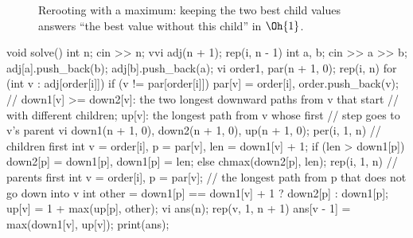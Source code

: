 \begin{figure}[htbp]
\centering
{}
\caption{Rerooting with a maximum: keeping the two best child values answers ``the best value without this child'' in $\Oh{1}$.}
\label{fig:reroot2}
\end{figure}

\begin{code}
void solve() {
    int n;
    cin >> n;
    vvi adj(n + 1);
    rep(i, n - 1) {
        int a, b;
        cin >> a >> b;
        adj[a].push_back(b);
        adj[b].push_back(a);
    }
    vi order{1}, par(n + 1, 0);
    rep(i, n) for (int v : adj[order[i]])
        if (v != par[order[i]]) par[v] = order[i], order.push_back(v);
    // down1[v] >= down2[v]: the two longest downward paths from v that start
    // with different children; up[v]: the longest path from v whose first
    // step goes to v's parent
    vi down1(n + 1, 0), down2(n + 1, 0), up(n + 1, 0);
    per(i, 1, n) {  // children first
        int v = order[i], p = par[v], len = down1[v] + 1;
        if (len > down1[p]) down2[p] = down1[p], down1[p] = len;
        else chmax(down2[p], len);
    }
    rep(i, 1, n) {  // parents first
        int v = order[i], p = par[v];
        // the longest path from p that does not go down into v
        int other = down1[p] == down1[v] + 1 ? down2[p] : down1[p];
        up[v] = 1 + max(up[p], other);
    }
    vi ans(n);
    rep(v, 1, n + 1) ans[v - 1] = max(down1[v], up[v]);
    print(ans);
}
\end{code}

